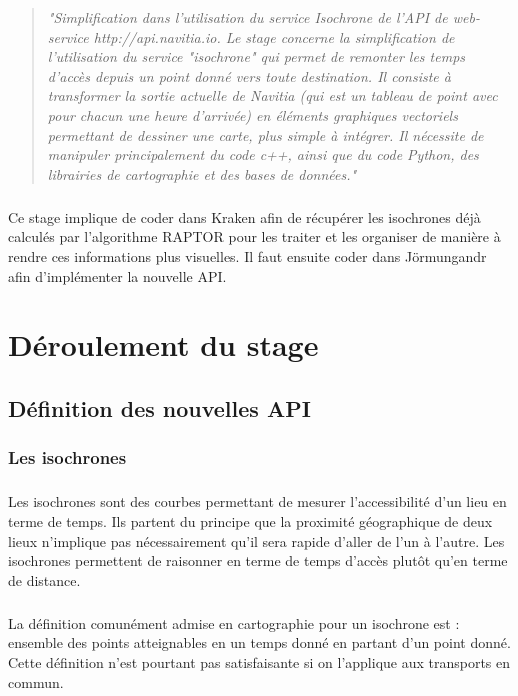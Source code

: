 \documentclass[a4paper]{report}
\begin{document}
\begin{quote}
	\emph{"Simplification dans l’utilisation du service Isochrone de l’API de web-service http://api.navitia.io. Le stage concerne la simplification de l’utilisation du service "isochrone" qui permet de remonter les temps d'accès depuis un point donné vers toute destination. Il consiste à transformer la sortie actuelle de Navitia (qui est un tableau de point avec pour chacun une heure d'arrivée) en éléments graphiques vectoriels permettant de dessiner une carte, plus simple à intégrer. Il nécessite de manipuler principalement du code c++, ainsi que du code Python, des librairies de cartographie et des bases de données."}
\end{quote}

\paragraph{} Ce stage implique de coder dans Kraken afin de récupérer les isochrones déjà calculés par l'algorithme RAPTOR pour les traiter et les organiser de manière à rendre ces informations plus visuelles. Il faut ensuite coder dans Jörmungandr afin d'implémenter la nouvelle API. 

\chapter{Déroulement du stage}

\section{Définition des nouvelles API}

\subsection{Les isochrones}

\paragraph{}Les isochrones sont des courbes permettant de mesurer l'accessibilité d'un lieu en terme de temps. Ils partent du principe que la proximité géographique de deux lieux n'implique pas nécessairement qu'il sera rapide d'aller de l'un à l'autre. Les isochrones permettent de raisonner en terme de temps d'accès plutôt qu'en terme de distance.

\paragraph{}La définition comunément admise en cartographie pour un isochrone est : ensemble des points atteignables en un temps donné en partant d'un point donné. Cette définition n'est pourtant pas satisfaisante si on l'applique aux transports en commun. 
\end{document}
